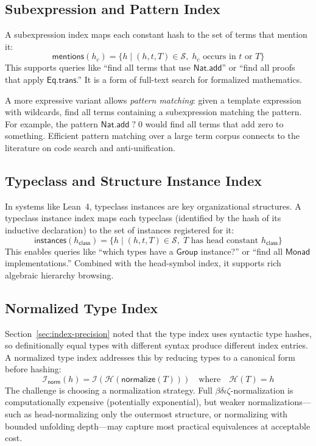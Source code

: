 \documentclass[11pt]{article}
\theoremstyle{definition}
\theoremstyle{plain}
\theoremstyle{remark}
\newcommand{\hash}{\mathcal{H}}
\newcommand{\hashset}{\mathcal{S}}
\newcommand{\typeindex}{\mathcal{I}}
\begin{document}
\subsection{Subexpression and Pattern Index}
\label{sec:subexpr-index}

A subexpression index maps each constant hash to the set of terms that mention it:
\[
  \textsf{mentions}(h_c) = \{ h \mid (h, t, T) \in \hashset,\; h_c \text{ occurs in } t \text{ or } T \}
\]
This supports queries like ``find all terms that use $\textsf{Nat.add}$'' or
``find all proofs that apply $\textsf{Eq.trans}$.''
It is a form of full-text search for formalized mathematics.

A more expressive variant allows \emph{pattern matching}: given a template expression
with wildcards, find all terms containing a subexpression matching the pattern.
For example, the pattern $\textsf{Nat.add}\;?\;0$ would find all terms that add zero
to something.
Efficient pattern matching over a large term corpus connects to the literature
on code search and anti-unification.

\subsection{Typeclass and Structure Instance Index}
\label{sec:instance-index}

In systems like Lean~4, typeclass instances are key organizational structures.
A typeclass instance index maps each typeclass (identified by the hash of its
inductive declaration) to the set of instances registered for it:
\[
  \textsf{instances}(h_{\textsf{class}}) = \{ h \mid (h, t, T) \in \hashset,\;
  T \text{ has head constant } h_{\textsf{class}} \}
\]
This enables queries like ``which types have a $\textsf{Group}$ instance?'' or
``find all $\textsf{Monad}$ implementations.''
Combined with the head-symbol index, it supports rich algebraic hierarchy browsing.

\subsection{Normalized Type Index}
\label{sec:norm-index}

Section~\ref{sec:index-precision} noted that the type index uses syntactic type hashes,
so definitionally equal types with different syntax produce different index entries.
A normalized type index addresses this by reducing types to a canonical form before hashing:
\[
  \typeindex_{\textsf{norm}}(h) = \typeindex(\hash(\textsf{normalize}(T)))
  \quad\text{where}\quad \hash(T) = h
\]
The challenge is choosing a normalization strategy.
Full $\beta\delta\iota\zeta$-normalization is computationally expensive (potentially
exponential), but weaker normalizations---such as head-normalizing only the outermost
structure, or normalizing with bounded unfolding depth---may capture most practical
equivalences at acceptable cost.
\end{document}

